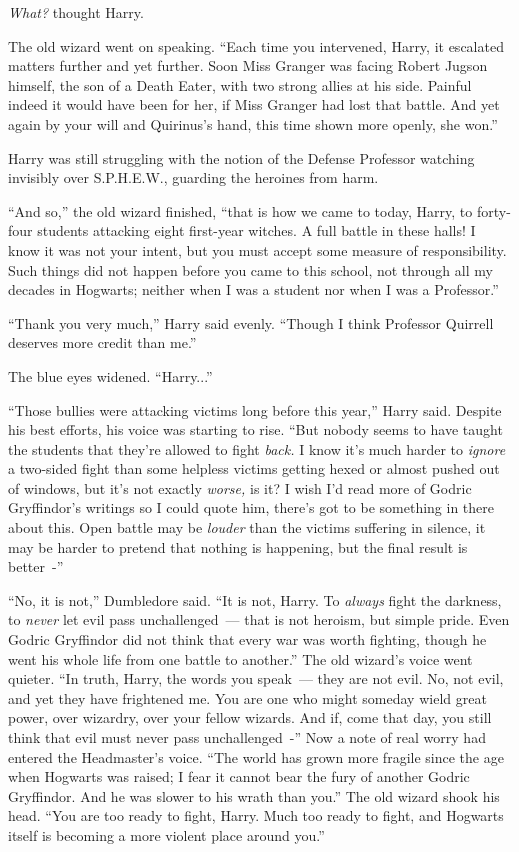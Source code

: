 \emph{What?} thought Harry.

The old wizard went on speaking. ``Each time you intervened, Harry, it escalated matters further and yet further. Soon Miss Granger was facing Robert Jugson himself, the son of a Death Eater, with two strong allies at his side. Painful indeed it would have been for her, if Miss Granger had lost that battle. And yet again by your will and Quirinus's hand, this time shown more openly, she won.''

Harry was still struggling with the notion of the Defense Professor watching invisibly over S.P.H.E.W., guarding the heroines from harm.

``And so,'' the old wizard finished, ``that is how we came to today, Harry, to forty-four students attacking eight first-year witches. A full battle in these halls! I know it was not your intent, but you must accept some measure of responsibility. Such things did not happen before you came to this school, not through all my decades in Hogwarts; neither when I was a student nor when I was a Professor.''

``Thank you very much,'' Harry said evenly. ``Though I think Professor Quirrell deserves more credit than me.''

The blue eyes widened. ``Harry...''

``Those bullies were attacking victims long before this year,'' Harry said. Despite his best efforts, his voice was starting to rise. ``But nobody seems to have taught the students that they're allowed to fight \emph{back.} I know it's much harder to \emph{ignore} a two-sided fight than some helpless victims getting hexed or almost pushed out of windows, but it's not exactly \emph{worse,} is it? I wish I'd read more of Godric Gryffindor's writings so I could quote him, there's got to be something in there about this. Open battle may be \emph{louder} than the victims suffering in silence, it may be harder to pretend that nothing is happening, but the final result is better~-''

``No, it is not,'' Dumbledore said. ``It is not, Harry. To \emph{always} fight the darkness, to \emph{never} let evil pass unchallenged~--- that is not heroism, but simple pride. Even Godric Gryffindor did not think that every war was worth fighting, though he went his whole life from one battle to another.'' The old wizard's voice went quieter. ``In truth, Harry, the words you speak~--- they are not evil. No, not evil, and yet they have frightened me. You are one who might someday wield great power, over wizardry, over your fellow wizards. And if, come that day, you still think that evil must never pass unchallenged~-'' Now a note of real worry had entered the Headmaster's voice. ``The world has grown more fragile since the age when Hogwarts was raised; I fear it cannot bear the fury of another Godric Gryffindor. And he was slower to his wrath than you.'' The old wizard shook his head. ``You are too ready to fight, Harry. Much too ready to fight, and Hogwarts itself is becoming a more violent place around you.''

